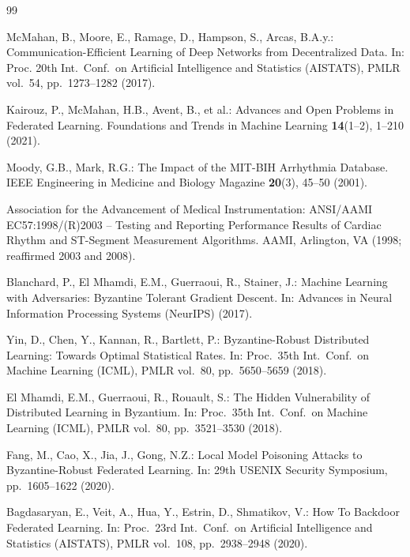 \documentclass[runningheads]{llncs}
\begin{document}
\begin{thebibliography}{99}

McMahan, B., Moore, E., Ramage, D., Hampson, S., Arcas, B.A.y.:
Communication-Efficient Learning of Deep Networks from Decentralized
Data. In: Proc. 20th Int.\ Conf.\ on Artificial Intelligence and
Statistics (AISTATS), PMLR vol.~54, pp.~1273--1282 (2017).

Kairouz, P., McMahan, H.B., Avent, B., et al.: Advances and Open
Problems in Federated Learning. Foundations and Trends in Machine
Learning \textbf{14}(1--2), 1--210 (2021). 

Moody, G.B., Mark, R.G.: The Impact of the MIT-BIH Arrhythmia
Database. IEEE Engineering in Medicine and Biology Magazine
\textbf{20}(3), 45--50 (2001). 

Association for the Advancement of Medical Instrumentation:
ANSI/AAMI EC57:1998/(R)2003 -- Testing and Reporting Performance
Results of Cardiac Rhythm and ST-Segment Measurement Algorithms.
AAMI, Arlington, VA (1998; reaffirmed 2003 and 2008).

Blanchard, P., El Mhamdi, E.M., Guerraoui, R., Stainer, J.:
Machine Learning with Adversaries: Byzantine Tolerant Gradient
Descent. In: Advances in Neural Information Processing Systems
(NeurIPS) (2017).

Yin, D., Chen, Y., Kannan, R., Bartlett, P.: Byzantine-Robust
Distributed Learning: Towards Optimal Statistical Rates. In:
Proc.\ 35th Int.\ Conf.\ on Machine Learning (ICML), PMLR
vol.~80, pp.~5650--5659 (2018).

El Mhamdi, E.M., Guerraoui, R., Rouault, S.: The Hidden
Vulnerability of Distributed Learning in Byzantium. In:
Proc.\ 35th Int.\ Conf.\ on Machine Learning (ICML), PMLR
vol.~80, pp.~3521--3530 (2018).

Fang, M., Cao, X., Jia, J., Gong, N.Z.: Local Model Poisoning
Attacks to Byzantine-Robust Federated Learning. In: 29th USENIX
Security Symposium, pp.~1605--1622 (2020).

Bagdasaryan, E., Veit, A., Hua, Y., Estrin, D., Shmatikov, V.:
How To Backdoor Federated Learning. In: Proc.\ 23rd Int.\ Conf.\
on Artificial Intelligence and Statistics (AISTATS), PMLR
vol.~108, pp.~2938--2948 (2020).


\end{thebibliography}
\end{document}
